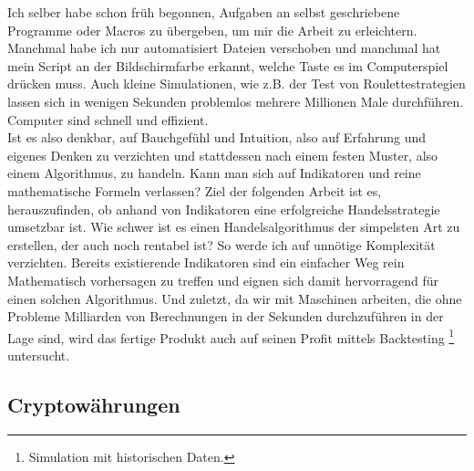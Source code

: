 \documentclass[12pt]{article}
\begin{document}
	Ich selber habe schon früh begonnen, Aufgaben an selbst geschriebene Programme oder Macros zu übergeben, um mir die Arbeit zu erleichtern. Manchmal habe ich nur automatisiert Dateien verschoben und manchmal hat mein Script an der Bildschirmfarbe erkannt, welche Taste es im Computerspiel drücken muss. Auch kleine Simulationen, wie z.B. der Test von Roulettestrategien lassen sich in wenigen Sekunden problemlos mehrere Millionen Male durchführen. Computer sind schnell und effizient.\\
	Ist es also denkbar, auf Bauchgefühl und Intuition, also auf Erfahrung und eigenes Denken zu verzichten und stattdessen nach einem festen Muster, also einem Algorithmus, zu handeln. Kann man sich auf Indikatoren und reine mathematische Formeln verlassen?
	Ziel der folgenden Arbeit ist es, herauszufinden, ob anhand von Indikatoren eine erfolgreiche Handelsstrategie umsetzbar ist. Wie schwer ist es einen Handelsalgorithmus der simpelsten Art zu erstellen, der auch noch rentabel ist? So werde ich auf unnötige Komplexität verzichten. Bereits existierende Indikatoren sind ein einfacher Weg rein Mathematisch vorhersagen zu treffen und eignen sich damit hervorragend für einen solchen Algorithmus. Und zuletzt, da wir mit Maschinen arbeiten, die ohne Probleme Milliarden von Berechnungen in der Sekunden durchzuführen in der Lage sind, wird das fertige Produkt auch auf seinen Profit mittels Backtesting \footnote{Simulation mit historischen Daten.} untersucht.

\subsection{Cryptowährungen}
\end{document}
